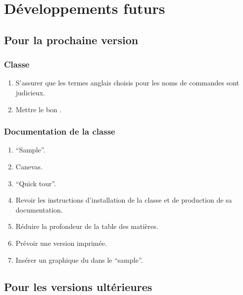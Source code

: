 \chapter{Développements futurs}\label{cha:devel-futurs}

\section{Pour la prochaine version}
\label{sec:pour-la-prochaine}

\subsection{Classe}
\label{sec:classe}

\begin{enumerate}
\item S'assurer que les termes anglais choisis pour les noms de commandes sont
  judicieux.
\item Mettre le bon .
\end{enumerate}

\subsection{Documentation de la classe}
\label{sec:documentation-de-la}

\begin{enumerate}
\item \foreignquote{english}{Sample}.
\item Canevas.
\item \foreignquote{english}{Quick tour}.
\item Revoir les instructions d'installation de la classe et de production de
  sa documentation.
\item Réduire la profondeur de la table des matières.
\item Prévoir une version imprimée.
\item Insérer un graphique du  dans le \foreignquote{english}{sample}.
\end{enumerate}

\section{Pour les versions ultérieures}
\label{sec:pour-les-versions}

